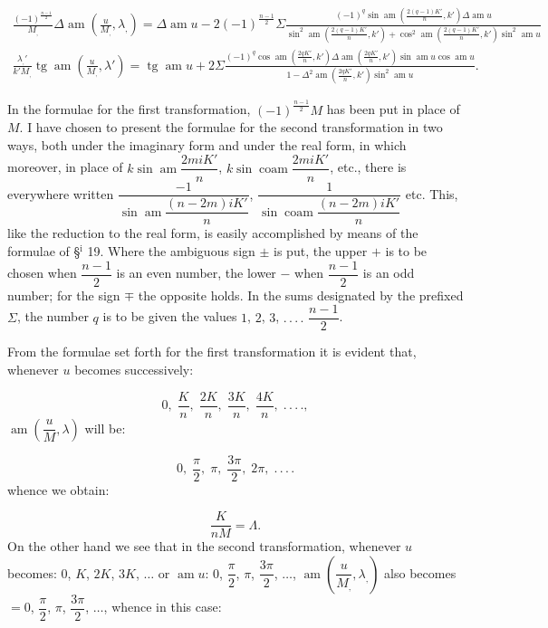 \documentclass{article}
\begin{document}
\[\begin{gathered}
\frac{(-1)^{\frac{n-1}{2}}}{M_{,}}\Delta\operatorname{am}\left(\frac{u}{M_{,}},\lambda_{,}\right)=\Delta\operatorname{am}u-2(-1)^{\frac{n-1}{2}}\Sigma\frac{(-1)^{q}\sin\operatorname{am}\left(\frac{2(q-1)K'}{n},k'\right)\Delta\operatorname{am}u}{\sin^{2}\operatorname{am}\left(\frac{2(q-1)K'}{n},k'\right)+\cos^{2}\operatorname{am}\left(\frac{2(q-1)K'}{n},k'\right)\sin^{2}\operatorname{am}u}\\[2.5ex]
\frac{\lambda_{,}'}{k'M_{,}}\operatorname{tg}\operatorname{am}\left(\frac{u}{M_{,}},\lambda'\right)=\operatorname{tg}\operatorname{am}u+2\Sigma\frac{(-1)^{q}\cos\operatorname{am}\left(\frac{2qK'}{n},k'\right)\Delta\operatorname{am}\left(\frac{2qK'}{n},k'\right)\sin\operatorname{am}u\cos\operatorname{am}u}{1-\Delta^{2}\operatorname{am}\left(\frac{2qK'}{n},k'\right)\sin^{2}\operatorname{am}u}.
\end{gathered}
\]

In the formulae for the first transformation, $(-1)^{\frac{n-1}{2}}M$ has been put in place of $M$. I have chosen to present the formulae for the second transformation in two ways, both under the imaginary form and under the real form, in which moreover, in place of $k\sin\operatorname{am}\dfrac{2miK'}{n}$, $k\sin\operatorname{coam}\dfrac{2miK'}{n}$, etc., there is everywhere written $\dfrac{-1}{\sin\operatorname{am}\dfrac{(n-2m)iK'}{n}}$, $\dfrac{1}{\sin\operatorname{coam}\dfrac{(n-2m)iK'}{n}}$ etc. This, like the reduction to the real form, is easily accomplished by means of the formulae of §$^{\mathrm{i}}$ 19. Where the ambiguous sign $\pm$ is put, the upper $+$ is to be chosen when $\dfrac{n-1}{2}$ is an even number, the lower $-$ when $\dfrac{n-1}{2}$ is an odd number; for the sign $\mp$ the opposite holds. In the sums designated by the prefixed $\Sigma$, the number $q$ is to be given the values $1$, $2$, $3$, $.\,.\,.\,.$ $\dfrac{n-1}{2}$.

From the formulae set forth for the first transformation it is evident that, whenever $u$ becomes successively:

\[
0,\;\frac{K}{n},\;\frac{2K}{n},\;\frac{3K}{n},\;\frac{4K}{n},\;.\,.\,.\,.,
\]
$\operatorname{am}\left(\dfrac{u}{M},\lambda\right)$ will be:

\[
0,\;\frac{\pi}{2},\;\pi,\;\frac{3\pi}{2},\;2\pi,\;.\,.\,.\,.
\]
whence we obtain:

\[
\frac{K}{nM}=\Lambda.
\]
On the other hand we see that in the second transformation, whenever $u$ becomes: $0$, $K$, $2K$, $3K$, $\ldots$ or $\operatorname{am}u$: $0$, $\dfrac{\pi}{2}$, $\pi$, $\dfrac{3\pi}{2}$, $\ldots$, $\operatorname{am}\left(\dfrac{u}{M_{,}},\lambda_{,}\right)$ also becomes $=0$, $\dfrac{\pi}{2}$, $\pi$, $\dfrac{3\pi}{2}$, $\ldots$, whence in this case:
\end{document}
